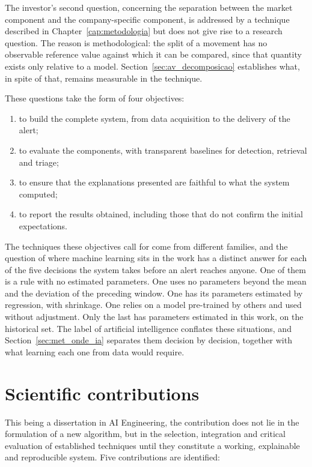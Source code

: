 The investor's second question, concerning the separation between the market component and the
company-specific component, is addressed by a technique described in
Chapter~\ref{cap:metodologia} but does not give rise to a research question. The reason is
methodological: the split of a movement has no observable reference value against which it can be
compared, since that quantity exists only relative to a model.
Section~\ref{sec:av_decomposicao} establishes what, in spite of that, remains measurable in the
technique.

These questions take the form of four objectives:

\begin{enumerate}
  \item to build the complete system, from data acquisition to the delivery of the alert;
  \item to evaluate the components, with transparent baselines for detection, retrieval and triage;
  \item to ensure that the explanations presented are faithful to what the system computed;
  \item to report the results obtained, including those that do not confirm the initial
        expectations.
\end{enumerate}

The techniques these objectives call for come from different families, and the question of
where machine learning sits in the work has a distinct answer for each of the five decisions
the system takes before an alert reaches anyone. One of them is a rule with no estimated
parameters. One uses no parameters beyond the mean and the deviation of the preceding window.
One has its parameters estimated by regression, with shrinkage. One relies on a model
pre-trained by others and used without adjustment. Only the last has parameters estimated in
this work, on the historical set. The label of artificial intelligence conflates these
situations, and Section~\ref{sec:met_onde_ia} separates them decision by decision, together with
what learning each one from data would require.

\section{Scientific contributions}
\label{sec:intro_contribuicoes}

This being a dissertation in \gls{AI} Engineering, the contribution does not lie in the formulation
of a new algorithm, but in the selection, integration and critical evaluation of established
techniques until they constitute a working, explainable and reproducible system. Five
contributions are identified:

